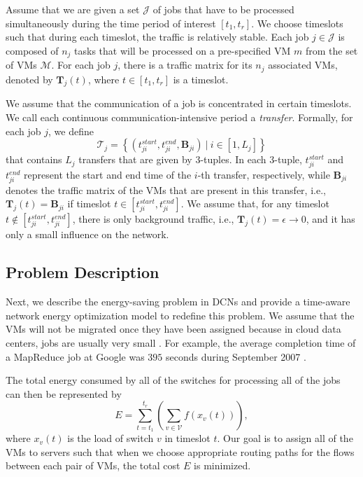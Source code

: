 \documentclass[journal,single-space,two column,twoside,10pt]{IEEEtran}
\begin{document}
Assume that we are given a set $\mathcal{J}$ of jobs that have to be processed simultaneously during the time period of interest $[t_1,t_{r}]$.
We choose timeslots such that during each timeslot, the traffic is relatively stable.
Each job $j \in \mathcal{J}$ is composed of $n_j$ tasks that will be processed on a pre-specified VM $m$ from the set of VMs $\mathcal{M}$. For each job $j$, there is a traffic matrix for its $n_j$ associated VMs, denoted by $\mathbf{T}_j(t)$, where $t \in [t_1,t_r]$ is a timeslot.

We assume that the communication of a job is concentrated in certain timeslots.
We call each continuous communication-intensive period a \emph{transfer}. Formally, for each job $j$, we define
\begin{equation}
\mathcal{T}_j = \left\{ (t_{ji}^{start}, t_{ji}^{end}, \mathbf{B}_{ji})~|~i \in [1,L_j] \right\}
\end{equation}
that contains $L_j$ transfers that are given by $3$-tuples. In each $3$-tuple,
$t_{ji}^{start}$ and $t_{ji}^{end}$ represent the start and end time of the $i$-th transfer, respectively, while
$\mathbf{B}_{ji}$ denotes the traffic matrix of the VMs
that are present in this transfer, i.e., $\mathbf{T}_j(t) = \mathbf{B}_{ji}$ if timeslot $t \in [t_{ji}^{start}, t_{ji}^{end}]$. We assume that, for any timeslot $t \not \in [t_{ji}^{start}, t_{ji}^{end}]$, there is only background traffic, i.e., $\mathbf{T}_j(t)=\epsilon\rightarrow0$, and it has only a small influence on the network.


\subsection{Problem Description}

Next, we describe the energy-saving problem in DCNs and provide a time-aware network energy optimization model to redefine this problem. We assume that the VMs
will not be migrated once they have been assigned because in cloud data centers, jobs are usually very small \cite{Xie_Ding-2012}. For example, the average completion time of a MapReduce job at Google was $395$ seconds during September 2007 \cite{Dean_Chemawat-2008}. 

The total energy consumed by all of the switches for processing all of the jobs can then be represented by
\begin{equation}
E = \sum_{t = t_1}^{t_{r}} \left( \sum_{v \in \mathcal{V}} f(x_v(t))\right) \label{eq:total_energy},
\end{equation}
where $x_v(t)$ is the load of switch $v$ in timeslot $t$. Our goal is to assign all of the VMs to servers such that when we choose appropriate routing paths for the flows between each pair of VMs, the total cost $E$ is minimized.
\end{document}
